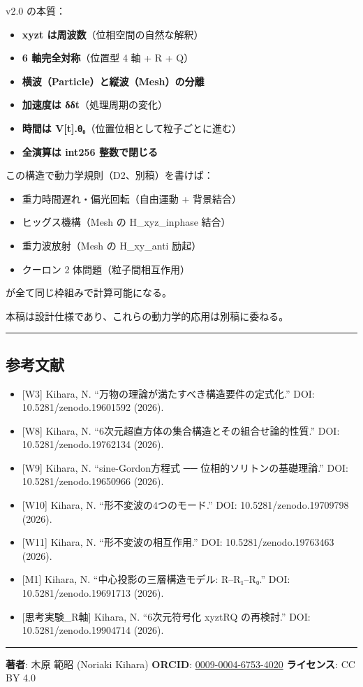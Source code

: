 \documentclass[a4paper,11pt]{ltjsarticle}
\providecommand{\tightlist}{\setlength{\itemsep}{0pt}\setlength{\parskip}{0pt}}
\begin{document}
v2.0 の本質：

\begin{itemize}
\tightlist
\item
  \textbf{xyzt は周波数}（位相空間の自然な解釈）
\item
  \textbf{6 軸完全対称}（位置型 4 軸 + R + Q）
\item
  \textbf{横波（Particle）と縦波（Mesh）の分離}
\item
  \textbf{加速度は δδt}（処理周期の変化）
\item
  \textbf{時間は V{[}t{]}.θ₀}（位置位相として粒子ごとに進む）
\item
  \textbf{全演算は int256 整数で閉じる}
\end{itemize}

この構造で動力学規則（D2、別稿）を書けば：

\begin{itemize}
\tightlist
\item
  重力時間遅れ・偏光回転（自由運動 + 背景結合）
\item
  ヒッグス機構（Mesh の H\_xyz\_inphase 結合）
\item
  重力波放射（Mesh の H\_xy\_anti 励起）
\item
  クーロン 2 体問題（粒子間相互作用）
\end{itemize}

が全て同じ枠組みで計算可能になる。

本稿は設計仕様であり、これらの動力学的応用は別稿に委ねる。

\begin{center}\rule{0.5\linewidth}{0.5pt}\end{center}

\subsection{参考文献}\label{ux53c2ux8003ux6587ux732e}

\begin{itemize}
\tightlist
\item
  {[}W3{]} Kihara, N. ``万物の理論が満たすべき構造要件の定式化.'' DOI:
  10.5281/zenodo.19601592 (2026).
\item
  {[}W8{]} Kihara, N. ``6次元超直方体の集合構造とその組合せ論的性質.''
  DOI: 10.5281/zenodo.19762134 (2026).
\item
  {[}W9{]} Kihara, N. ``sine-Gordon方程式 ── 位相的ソリトンの基礎理論.''
  DOI: 10.5281/zenodo.19650966 (2026).
\item
  {[}W10{]} Kihara, N. ``形不変波の4つのモード.'' DOI:
  10.5281/zenodo.19709798 (2026).
\item
  {[}W11{]} Kihara, N. ``形不変波の相互作用.'' DOI:
  10.5281/zenodo.19763463 (2026).
\item
  {[}M1{]} Kihara, N. ``中心投影の三層構造モデル: R--R₁--R₀.'' DOI:
  10.5281/zenodo.19691713 (2026).
\item
  {[}思考実験\_R軸{]} Kihara, N. ``6次元符号化 xyztRQ の再検討.'' DOI:
  10.5281/zenodo.19904714 (2026).
\end{itemize}

\begin{center}\rule{0.5\linewidth}{0.5pt}\end{center}

\textbf{著者}: 木原 範昭 (Noriaki Kihara) \textbf{ORCID}:
\href{https://orcid.org/0009-0004-6753-4020}{0009-0004-6753-4020}
\textbf{ライセンス}: CC BY 4.0
\end{document}
